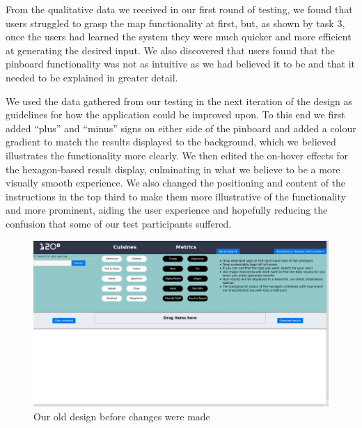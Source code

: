 \documentclass[10pt,a4paper]{article}
\begin{document}
From the qualitative data we received in our first round of testing, we found that users struggled to grasp the map functionality at first, but, as shown by task 3, once the users had learned the system they were much quicker and more efficient at generating the desired input. We also discovered that users found that the pinboard functionality was not as intuitive as we had believed it to be and that it needed to be explained in greater detail.

We used the data gathered from our testing in the next iteration of the design as guidelines for how the application could be improved upon. To this end we first added “plus” and “minus” signs on either side of the pinboard and added a colour gradient to match the results displayed to the background, which we believed illustrates the functionality more clearly. We then edited the on-hover effects for the hexagon-based result display, culminating in what we believe to be a more visually smooth experience. We also changed the positioning and content of the instructions in the top third to make them more illustrative of the functionality and more prominent, aiding the user experience and hopefully reducing the confusion that some of our test participants suffered.

\begin{figure}[H]
	\begin{center}
		\includegraphics[scale=0.2]{oldScreenshot.png}
		\caption{Our old design before changes were made}
		\label{figure:old-design}
	\end{center}
\end{figure}
\end{document}
